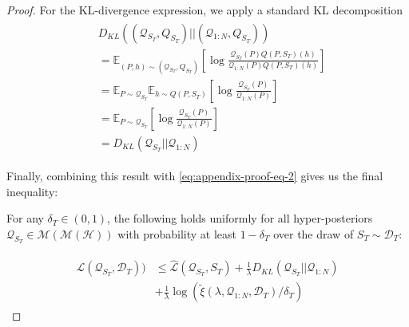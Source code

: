 \documentclass[letterpaper]{article} %
\theoremstyle{definition}
\newcommand{\Expect}[2]{\mathbb{E}_{#1}\left [#2 \right ]}
\begin{document}
\begin{proof}
	For the KL-divergence expression, we apply a standard KL decomposition
%	
	\begin{align*}
	\begin{split}
	&D_{KL}((\mathcal{Q}_{S_T}, Q_{S_T})||(\mathcal{Q}_{1:N}, Q_{S_T}))\\
	&=\Expect{(P,h)\sim (\mathcal{Q}_{S_T},Q_{S_T})}{\log\frac{\mathcal{Q}_{S_T}(P)Q(P, S_T)(h)}{\mathcal{Q}_{1:N}(P)Q(P, S_T)(h)}}\\
	&=\mathbb{E}_{P\sim \mathcal{Q}_{S_T}}\Expect{h\sim Q(P,S_T)}{\log\frac{\mathcal{Q}_{S_T}(P)}{\mathcal{Q}_{1:N}(P)}}\\
	&=\Expect{P\sim \mathcal{Q}_{S_T}}{\log\frac{\mathcal{Q}_{S_T}(P)}{\mathcal{Q}_{1:N}(P)}}\\
	&=D_{KL}(\mathcal{Q}_{S_T}||\mathcal{Q}_{1:N})
	\end{split}
	\end{align*}
	
	Finally, combining this result with \eqref{eq:appendix-proof-eq-2} gives us the final inequality:
	
	For any $\delta_T \in (0,1)$, the following holds uniformly for all hyper-posteriors $\mathcal{Q}_{S_T}\in \mathcal{M}(\mathcal{M}(\mathcal{H}))$ with probability at least $1-\delta_T$ over the draw of $S_T\sim \mathcal{D}_T$:
	
	\begin{align*}
	\begin{split}
	\mathcal{L}(\mathcal{Q}_{S_T}, \mathcal{D}_T)) &\leq \hat{\mathcal{L}}(\mathcal{Q}_{S_T}, S_T) + \frac{1}{\lambda}D_{KL}(\mathcal{Q}_{S_T}||\mathcal{Q}_{1:N})\\
	&+\frac{1}{\lambda}\log\left (\tilde{\xi}(\lambda,\mathcal{Q}_{1:N},\mathcal{D}_T)/\delta_T\right )
	\end{split}
	\end{align*}
	\end{proof}
	
\end{document}
